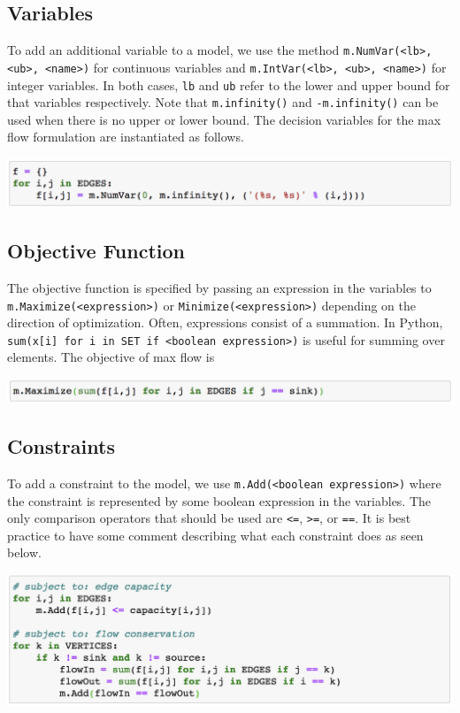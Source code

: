 \documentclass[11 pt]{article}
\newcommand{\code}[1]{\colorbox{gray!10}{\textcolor{black!85}{\texttt{#1}}}}
\begin{document}
\subsection{Variables}

To add an additional variable to a model, we use the method \code{m.NumVar(<lb>, <ub>, <name>)} for continuous variables and \code{m.IntVar(<lb>, <ub>, <name>)} for integer variables. In both cases, \texttt{lb} and \texttt{ub} refer to the lower and upper bound for that variables respectively. Note that \texttt{m.infinity()} and \texttt{-m.infinity()} can be used when there is no upper or lower bound. The decision variables for the max flow formulation are instantiated as follows.
\begin{center}
\includegraphics[scale=0.7]{var.png}
\end{center}

\subsection{Objective Function}

The objective function is specified by passing an expression in the variables to \code{m.Maximize(<expression>)} or \code{Minimize(<expression>)} depending on the direction of optimization. Often, expressions consist of a summation. In Python, \code{sum(x[i] for i in SET if <boolean expression>)} is useful for summing over elements. The objective of max flow is
\begin{center}
\includegraphics[scale=0.7]{obj.png}
\end{center}

\subsection{Constraints}

To add a constraint to the model, we use \code{m.Add(<boolean expression>)} where the constraint is represented by some boolean expression in the variables. The only comparison operators that should be used are \texttt{<=}, \texttt{>=}, or \texttt{==}. It is best practice to have some comment describing what each constraint does as seen below.
\begin{center}
\includegraphics[scale=0.7]{constraints.png}
\end{center}
\end{document}
